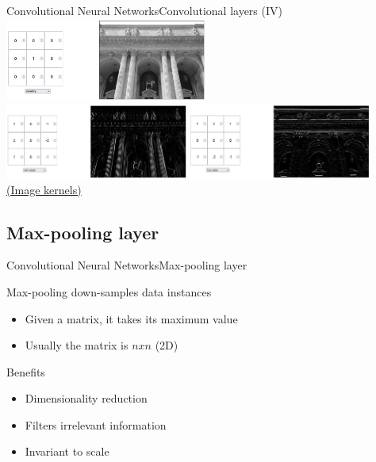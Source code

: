 \documentclass[10pt,compress]{beamer} %
\begin{document}
\begin{frame}{Convolutional Neural Networks}{Convolutional layers (IV)}
	\centering
	\includegraphics[width=0.5\textwidth]{figs/convolution1.png}\\\bigskip
	\includegraphics[width=0.45\textwidth]{figs/convolution2.png}
	\includegraphics[width=0.45\textwidth]{figs/convolution3.png}\\
    \bigskip
    \href{https://setosa.io/ev/image-kernels/}{(Image kernels)}
\end{frame}

\subsection{Max-pooling layer}
\begin{frame}{Convolutional Neural Networks}{Max-pooling layer}

    \bigskip

    \begin{flushleft}
    Max-pooling down-samples data instances
	\begin{itemize}
		\item Given a matrix, it takes its maximum value
		\item Usually the matrix is $n x n$ (2D)
	\end{itemize}
	Benefits
	\begin{itemize}
		\item Dimensionality reduction
		\item Filters irrelevant information
        \item Invariant to scale
	\end{itemize}
    \end{flushleft}
\end{frame}
\end{document}
